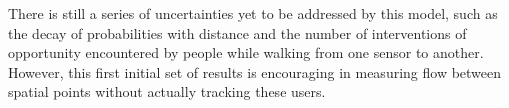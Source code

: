 There is still a series of uncertainties yet to be addressed by this model, such as the decay of probabilities with distance and the number of interventions of opportunity encountered by people while walking from one sensor to another.
However, this first initial set of results is encouraging in measuring flow between spatial points without actually tracking these users.
